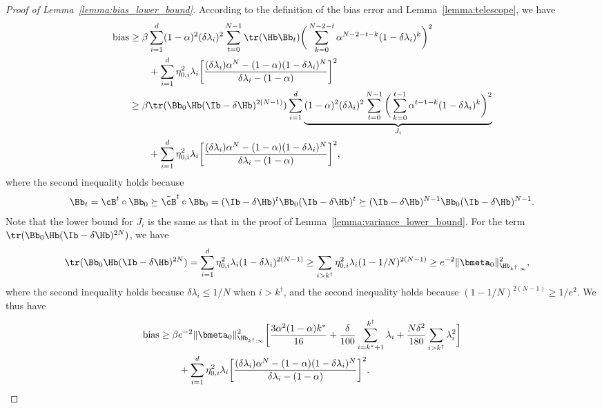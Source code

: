 \documentclass[11pt]{article}
\begin{document}
\begin{proof}[Proof of Lemma~\ref{lemma:bias_lower_bound}]
According to the definition of the bias error and Lemma~\ref{lemma:telescope}, we have
\begin{align*}
\mathrm{bias}&\ge\beta\sum_{i=1}^d(1-\alpha)^2(\delta\lambda_i)^2\sum_{t=0}^{N-1}\tr(\Hb\Bb_t)\bigg(\sum_{k=0}^{N-2-t}\alpha^{N-2-t-k}(1-\delta\lambda_i)^k\bigg)^2\\
&\qquad+\sum_{i=1}^d\eta_{0, i}^2\lambda_i\bigg[\frac{(\delta\lambda_i)\alpha^N-(1-\alpha)(1-\delta\lambda_i)^N}{\delta\lambda_i-(1-\alpha)}\bigg]^2\\
&\ge\beta\tr(\Bb_0\Hb(\Ib-\delta\Hb)^{2(N-1)})\sum_{i=1}^d\underbrace{(1-\alpha)^2(\delta\lambda_i)^2\sum_{t=0}^{N-1}\bigg(\sum_{k=0}^{t-1}\alpha^{t-1-k}(1-\delta\lambda_i)^k\bigg)^2}_{J_i}\\
&\qquad+\sum_{i=1}^d\eta_{0, i}^2\lambda_i\bigg[\frac{(\delta\lambda_i)\alpha^N-(1-\alpha)(1-\delta\lambda_i)^N}{\delta\lambda_i-(1-\alpha)}\bigg]^2,
\end{align*}
where the second inequality holds because 
\begin{align*}
\Bb_t=\cB^t\circ\Bb_0\succeq\tilde\cB^t\circ\Bb_0=(\Ib-\delta\Hb)^t\Bb_0(\Ib-\delta\Hb)^t\succeq(\Ib-\delta\Hb)^{N-1}\Bb_0(\Ib-\delta\Hb)^{N-1}.
\end{align*}
Note that the lower bound for $J_i$ is the same as that in the proof of Lemma~\ref{lemma:variance_lower_bound}. For the term $\tr(\Bb_0\Hb(\Ib-\delta\Hb)^{2N})$, we have
\begin{align*}
\tr(\Bb_0\Hb(\Ib-\delta\Hb)^{2N})&=\sum_{i=1}^d\eta_{0, i}^2\lambda_i(1-\delta\lambda_i)^{2(N-1)}\ge\sum_{i>k^\dagger}\eta_{0, i}^2\lambda_i(1-1/N)^{2(N-1)}\ge e^{-2}\|\bmeta_0\|_{\Hb_{k^\dagger:\infty}}^2,
\end{align*}
where the second inequality holds because $\delta\lambda_i\le1/N$ when $i>k^\dagger$, and the second inequality holds because $(1-1/N)^{2(N-1)}\ge1/e^2$. We thus have
\begin{align*}
\mathrm{bias}&\ge\beta e^{-2}\|\bmeta_0\|_{\Hb_{k^\dagger:\infty}}^2\bigg[\frac{3\alpha^2(1-\alpha)k^*}{16}+\frac{\delta}{100}\sum_{i=k^*+1}^{k^\dagger}\lambda_i+\frac{N\delta^2}{180}\sum_{i>k^\dagger}\lambda_i^2\bigg]\\
&\qquad+\sum_{i=1}^d\eta_{0, i}^2\lambda_i\bigg[\frac{(\delta\lambda_i)\alpha^N-(1-\alpha)(1-\delta\lambda_i)^N}{\delta\lambda_i-(1-\alpha)}\bigg]^2.
\end{align*}
\end{proof}
\end{document}
